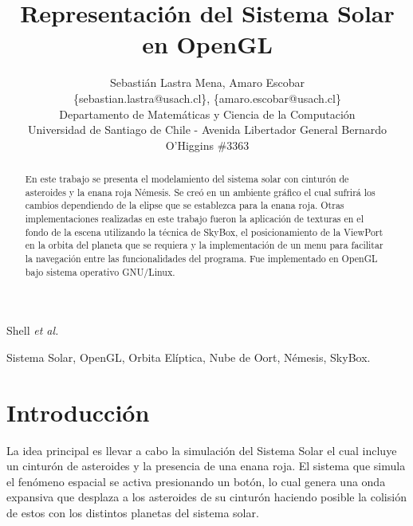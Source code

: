 \documentclass[journal]{IEEEtran}
\begin{document}
\title{Representación del Sistema Solar en OpenGL}

\author{Sebastián Lastra Mena, Amaro Escobar\\ \{sebastian.lastra@usach.cl\}, \{amaro.escobar@usach.cl\}\\Departamento de Matemáticas y Ciencia de la Computación \\ Universidad de Santiago de Chile - Avenida Libertador General Bernardo O'Higgins \#3363 
}

{Shell \MakeLowercase{\textit{et al.}}}

\maketitle

\begin{abstract}
	En este trabajo se presenta el modelamiento del sistema solar con cinturón de asteroides y la enana roja 	Némesis. Se creó en un ambiente gráfico el cual sufrirá los cambios dependiendo de la elipse que se establezca para la enana roja. Otras implementaciones realizadas en este trabajo fueron la aplicación de texturas en el fondo de la escena utilizando la técnica de SkyBox, el posicionamiento de la ViewPort en la orbita del planeta que se requiera y la implementación de un menu para facilitar la navegación entre las funcionalidades del programa. Fue implementado en OpenGL bajo sistema operativo GNU/Linux.
\end{abstract}

\begin{keywords}
	Sistema Solar, OpenGL, Orbita Elíptica, Nube de Oort, Némesis, SkyBox.
\end{keywords}

\IEEEpeerreviewmaketitle

\section{Introducción}

	La idea principal es llevar a cabo la simulación del Sistema Solar el cual incluye un cinturón de asteroides y la presencia de una enana roja. El sistema que simula el fenómeno espacial se activa presionando un botón, lo cual genera una onda expansiva que desplaza a los asteroides de su cinturón haciendo posible la colisión de estos con los distintos planetas del sistema solar.\\
\end{document}
